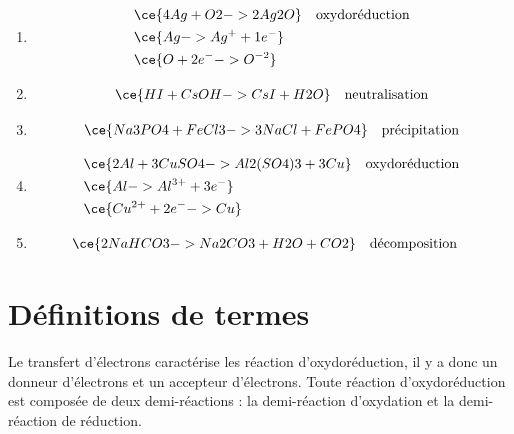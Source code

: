 \documentclass[
  11pt,
  a4paper,
  openany]{book}
\providecommand{\tightlist}{%
  \setlength{\itemsep}{0pt}\setlength{\parskip}{0pt}}
\begin{document}
\begin{Answer}

\begin{enumerate}
\def\labelenumi{\alph{enumi}.}
\tightlist
\item
  \[
  \begin{split}
  & \ce{4 Ag + O2 -> 2 Ag2O} \quad \text{oxydoréduction} \\
  & \ce{Ag -> Ag^+ + 1e^-} \\
  & \ce{O + 2e^- -> O^{-2}}
  \end{split}
  \]
\item
  \[
  \begin{split}
  \ce{HI + CsOH -> CsI + H2O} \quad \text{neutralisation}
  \end{split}
  \]
\item
  \[
  \begin{split}
  \ce{Na3PO4 + FeCl3 -> 3 NaCl + FePO4} \quad \text{précipitation}
  \end{split}
  \]
\item
  \[
  \begin{split}
  & \ce{2 Al + 3 CuSO4 -> Al2(SO4)3 + 3 Cu} \quad \text{oxydoréduction} \\
  & \ce{Al -> Al^{3+} + 3e^-} \\
  & \ce{Cu^{2+} + 2e^- -> Cu}
  \end{split}
  \]
\item
  \[
  \begin{split}
  & \ce{2 NaHCO3 -> Na2CO3 + H2O + CO2} \quad \text{décomposition}
  \end{split}
  \]
\end{enumerate}

\end{Answer}

\clearpage

\hypertarget{duxe9finitions-de-termes}{%
\section{Définitions de termes}\label{duxe9finitions-de-termes}}

Le transfert d'électrons caractérise les réaction d'oxydoréduction, il y a donc un donneur d'électrons et un accepteur d'électrons. Toute réaction d'oxydoréduction est composée de deux demi-réactions : la demi-réaction d'oxydation et la demi-réaction de réduction.
\end{document}
